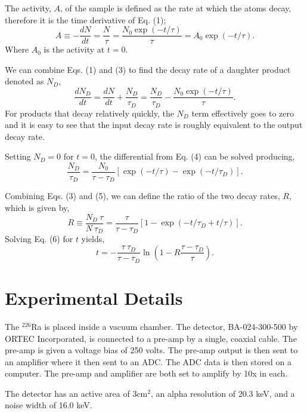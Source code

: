 \documentclass[10pt]{IEEEtran}
\begin{document}
The activity, $A$, of the sample is defined as the rate at which the atoms decay, therefore it is the time derivative of Eq. (1)\cite{blackboard};
	\begin{equation}
		A \equiv -\frac{d N}{dt} = \frac{N}{\tau} = \frac{N_0 \exp(-t/\tau)}{\tau} = A_0\exp(-t/\tau).
	\end{equation}
Where $A_0$ is the activity at $t=0$.

We can combine Eqs. (1) and (3) to find the decay rate of a daughter product denoted as $N_D$\cite{blackboard},
	\begin{equation}
		\frac{d N_D}{dt} = \frac{d N}{dt} + \frac{N_D}{\tau_D} = \frac{N_D}{\tau_D} - \frac{N_0 \exp(-t/\tau)}{\tau}.
	\end{equation}
For products that decay relatively quickly, the $N_D$ term effectively goes to zero and it is easy to see that the input decay rate is roughly equivalent to the output decay rate.

Setting $N_{D} = 0$ for $t = 0$, the differential from Eq. (4) can be solved producing,
	\begin{equation}
		\frac{N_D}{\tau_D} = \frac{N_0}{\tau - \tau_D}[\exp(-t/\tau)-\exp(-t/\tau_D)].
	\end{equation}

Combining Eqs. (3) and (5), we can define the ratio of the two decay rates, $R$, which is given by,
	\begin{equation}
		R \equiv \frac{N_D\ \tau}{N\ \tau_D} = \frac{\tau}{\tau-\tau_D}[1-\exp(-t/\tau_D+t/\tau)].
	\end{equation}
Solving Eq. (6) for $t$ yields\cite{blackboard},
	\begin{equation}
		t = -\frac{\tau\ \tau_D}{\tau-\tau_D}\ln\left(1-R\frac{\tau-	\tau_D}{\tau}\right).
	\end{equation}

\section{Experimental Details}


The $^{226}$Ra is placed inside a vacuum chamber. The detector, BA-024-300-500 by ORTEC Incorporated, is connected to a pre-amp by a single, coaxial cable. The pre-amp is given a voltage bias of 250 volts. The pre-amp output is then sent to an amplifier where it then sent to an ADC. The ADC data is then stored on a computer. The pre-amp and amplifier are both set to amplify by 10x in each.

The detector has an active area of 3cm$^{2}$, an alpha resolution of 20.3 keV, and a noise width of 16.0 keV. 
\end{document}
